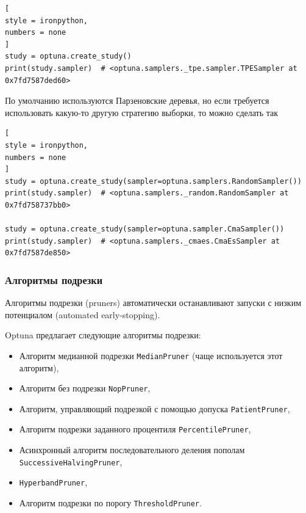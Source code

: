 \documentclass[%
	11pt,
	a4paper,
	utf8,
		]{article}
\begin{document}
\begin{lstlisting}[
style = ironpython,
numbers = none
]
study = optuna.create_study()
print(study.sampler)  # <optuna.samplers._tpe.sampler.TPESampler at 0x7fd7587ded60>
\end{lstlisting}

По умолчанию используются Парзеновские деревья, но если требуется использовать какую-то другую стратегию выборки, то можно сделать так
\begin{lstlisting}[
style = ironpython,
numbers = none
]
study = optuna.create_study(sampler=optuna.samplers.RandomSampler())
print(study.sampler)  # <optuna.samplers._random.RandomSampler at 0x7fd758737bb0>

study = optuna.create_study(sampler=optuna.sampler.CmaSampler())
print(study.sampler)  # <optuna.samplers._cmaes.CmaEsSampler at 0x7fd7587de850>
\end{lstlisting}

\subsubsection{Алгоритмы подрезки}

Алгоритмы подрезки (pruners) автоматически останавливают запуски с низким потенциалом (automated early-stopping).

Optuna предлагает следующие алгоритмы подрезки:
\begin{itemize}
	\item Алгоритм медианной подрезки \verb|MedianPruner| (чаще используется этот алгоритм),
	
	\item Алгоритм без подрезки \verb|NopPruner|,
	
	\item Алгоритм, управляющий подрезкой с помощью допуска \verb|PatientPruner|,
	
	\item Алгоритм подрезки заданного процентиля \verb|PercentilePruner|,
	
	\item Асинхронный алгоритм последовательного деления пополам \verb|SuccessiveHalvingPruner|,
	
	\item \verb|HyperbandPruner|,
	
	\item Алгоритм подрезки по порогу \verb|ThresholdPruner|.
\end{itemize}
\end{document}
